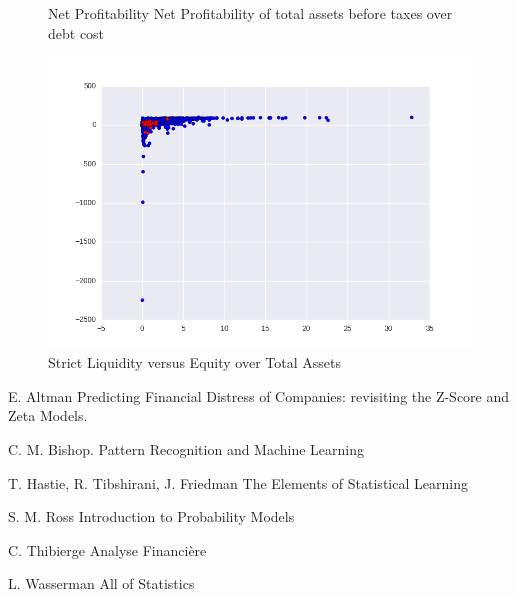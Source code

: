 \documentclass[DIV=calc, paper=a4, fontsize=11pt, twocolumn]{scrartcl}
\begin{document}
\begin{appendices}
\begin{figure}[h]
    \caption{Net Profitability Net Profitability of total assets before taxes over debt cost}
  \end{figure}
  \begin{figure}[h]
    \centering
    \includegraphics[width=0.8\linewidth]{cr14xr19.png}
    \caption{Strict Liquidity versus Equity over Total Assets}
  \end{figure}
\end{appendices}
\clearpage


\begin{thebibliography}{99} 
E. Altman
\newblock Predicting Financial Distress of Companies: revisiting the Z-Score and Zeta Models.

C. M. Bishop.
\newblock Pattern Recognition and Machine Learning

T. Hastie, R. Tibshirani, J. Friedman
\newblock The Elements of Statistical Learning

S. M. Ross
\newblock Introduction to Probability Models

C. Thibierge
\newblock Analyse Financière

L. Wasserman
\newblock All of Statistics
\end{thebibliography}
\end{document}
